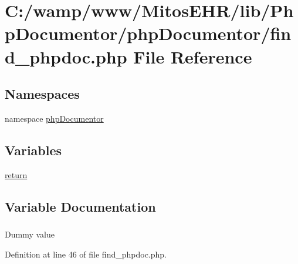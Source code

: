 \hypertarget{find__phpdoc_8php}{\section{\-C\-:/wamp/www/\-Mitos\-E\-H\-R/lib/\-Php\-Documentor/php\-Documentor/find\-\_\-phpdoc.php \-File \-Reference}
\label{find__phpdoc_8php}
}
\subsection*{\-Namespaces}
\begin{DoxyCompactItemize}
\item 
namespace \hyperlink{namespacephp_documentor}{php\-Documentor}
\end{DoxyCompactItemize}
\subsection*{\-Variables}
\begin{DoxyCompactItemize}
\item 
\hyperlink{find__phpdoc_8php_a9717e7bbecb906637e86cef6da3d83c2}{return}
\end{DoxyCompactItemize}


\subsection{\-Variable \-Documentation}
\hypertarget{find__phpdoc_8php_a9717e7bbecb906637e86cef6da3d83c2}{
\subsubsection[{return}]{}}\label{find__phpdoc_8php_a9717e7bbecb906637e86cef6da3d83c2}
\-Dummy value 

\-Definition at line 46 of file find\-\_\-phpdoc.\-php.

